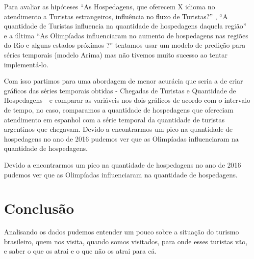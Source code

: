 \documentclass[review]{elsarticle}
\begin{document}
Para avaliar as hipóteses “As Hospedagens, que oferecem X idioma no atendimento a Turistas estrangeiros, influência no fluxo de Turistas?” , “A quantidade de Turistas influencia na quantidade de hospedagens daquela região” e a última “As Olimpíadas influenciaram no aumento de hospedagens nas regiões do Rio e alguns estados próximos ?” tentamos usar um modelo de predição para séries temporais (modelo Arima) mas não tivemos muito sucesso ao tentar implementá-lo.

Com isso partimos para uma abordagem de menor acurácia que seria a de criar gráficos das séries temporais obtidas - Chegadas de Turistas e Quantidade de Hospedagens - e comparar as variáveis nos dois gráficos de acordo com o intervalo de tempo, no caso, comparamos a quantidade de hospedagens que ofereciam atendimento em espanhol com a série temporal da quantidade de turistas argentinos que chegavam. Devido a encontrarmos um pico na quantidade de hospedagens no ano de 2016 pudemos ver que as Olimpíadas influenciaram na quantidade de hospedagens.

Devido a encontrarmos um pico na quantidade de hospedagens no ano de 2016 pudemos ver que as Olimpíadas influenciaram na quantidade de hospedagens.

\section{Conclusão}
Analisando os dados pudemos entender um pouco sobre a situação do turismo brasileiro, quem nos visita, quando somos visitados, para onde esses turistas vão, e saber o que os atrai e o que não os atrai para cá.
\end{document}
